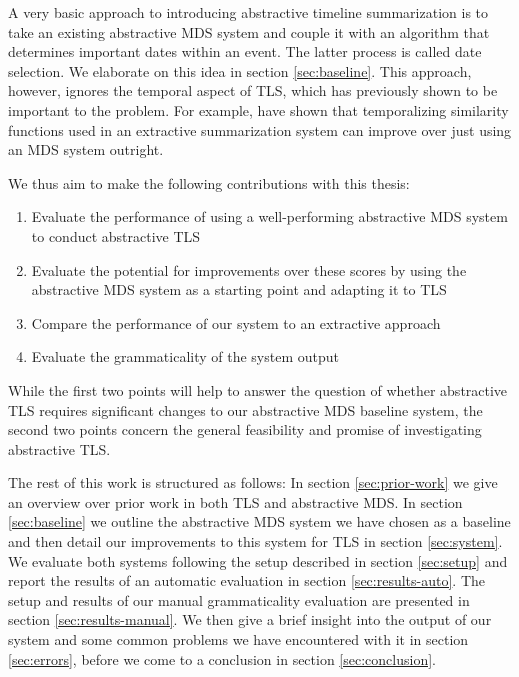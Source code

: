 \documentclass[a4paper,BCOR=10mm]{report}
\numberwithin{lemma}{chapter}
\numberwithin{definition}{chapter}
\begin{document}
A very basic approach to introducing abstractive timeline summarization is to take an existing abstractive MDS system and couple it with an algorithm that determines important dates within an event. The latter process is called date selection. We elaborate on this idea in section \ref{sec:baseline}. This approach, however, ignores the temporal aspect of TLS, which has previously shown to be important to the problem. For example, \citet{markert} have shown that temporalizing similarity functions used in an extractive summarization system can improve over just using an MDS system outright.

We thus aim to make the following contributions with this thesis:

\begin{enumerate}
\item{Evaluate the performance of using a well-performing abstractive MDS system to conduct abstractive TLS}
\item{Evaluate the potential for improvements over these scores by using the abstractive MDS system as a starting point and adapting it to TLS}
\item{Compare the performance of our system to an extractive approach}
\item{Evaluate the grammaticality of the system output}
\end{enumerate}

While the first two points will help to answer the question of whether abstractive TLS requires significant changes to our abstractive MDS baseline system, the second two points concern the general feasibility and promise of investigating abstractive TLS.

The rest of this work is structured as follows:
In section \ref{sec:prior-work} we give an overview over prior work in both TLS and abstractive MDS.
In section \ref{sec:baseline} we outline the abstractive MDS system we have chosen as a baseline and then detail our improvements to this system for TLS in section \ref{sec:system}.
We evaluate both systems following the setup described in 
section \ref{sec:setup} and report the results of an automatic evaluation in section \ref{sec:results-auto}.
The setup and results of our manual grammaticality evaluation are presented in section \ref{sec:results-manual}.
We then give a brief insight into the output of our system and some common problems we have encountered with it in section \ref{sec:errors}, before we come to a conclusion in section \ref{sec:conclusion}.

\end{document}
